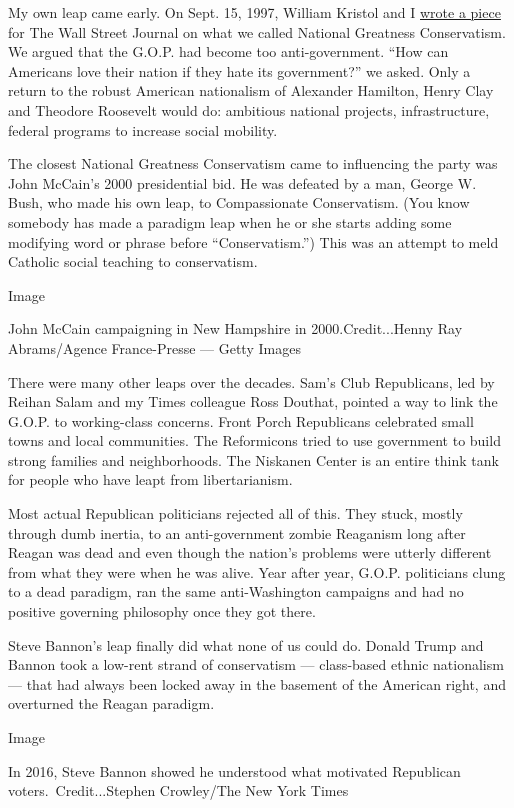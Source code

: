 My own leap came early. On Sept. 15, 1997, William Kristol and I
\href{https://www.wsj.com/articles/SB874276753849168000}{wrote a piece}
for The Wall Street Journal on what we called National Greatness
Conservatism. We argued that the G.O.P. had become too anti-government.
``How can Americans love their nation if they hate its government?'' we
asked. Only a return to the robust American nationalism of Alexander
Hamilton, Henry Clay and Theodore Roosevelt would do: ambitious national
projects, infrastructure, federal programs to increase social mobility.

The closest National Greatness Conservatism came to influencing the
party was John McCain's 2000 presidential bid. He was defeated by a man,
George W. Bush, who made his own leap, to Compassionate Conservatism.
(You know somebody has made a paradigm leap when he or she starts adding
some modifying word or phrase before ``Conservatism.'') This was an
attempt to meld Catholic social teaching to conservatism.

Image

John McCain campaigning in New Hampshire in 2000.Credit...Henny Ray
Abrams/Agence France-Presse --- Getty Images

There were many other leaps over the decades. Sam's Club Republicans,
led by Reihan Salam and my Times colleague Ross Douthat, pointed a way
to link the G.O.P. to working-class concerns. Front Porch Republicans
celebrated small towns and local communities. The Reformicons tried to
use government to build strong families and neighborhoods. The Niskanen
Center is an entire think tank for people who have leapt from
libertarianism.

Most actual Republican politicians rejected all of this. They stuck,
mostly through dumb inertia, to an anti-government zombie Reaganism long
after Reagan was dead and even though the nation's problems were utterly
different from what they were when he was alive. Year after year, G.O.P.
politicians clung to a dead paradigm, ran the same anti-Washington
campaigns and had no positive governing philosophy once they got there.

Steve Bannon's leap finally did what none of us could do. Donald Trump
and Bannon took a low-rent strand of conservatism --- class-based ethnic
nationalism --- that had always been locked away in the basement of the
American right, and overturned the Reagan paradigm.

Image

In 2016, Steve Bannon showed he understood what motivated Republican
voters.~Credit...Stephen Crowley/The New York Times

